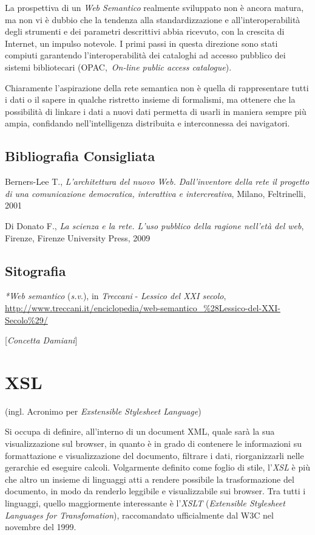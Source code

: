 {La prospettiva di un \emph{Web Semantico} realmente sviluppato non è
ancora matura, ma non vi è dubbio che la tendenza alla standardizzazione
e all'interoperabilità degli strumenti e dei parametri descrittivi abbia
ricevuto, con la crescita di Internet, un impulso notevole. I primi
passi in questa direzione sono stati compiuti garantendo
l'interoperabilità dei cataloghi ad accesso pubblico dei sistemi
bibliotecari (OPAC,~\emph{On-line public access catalogue}).

Chiaramente l'aspirazione della rete semantica non è quella di
rappresentare tutti i dati o il sapere in qualche ristretto insieme di
formalismi, ma ottenere che la possibilità di linkare i dati a nuovi
dati permetta di usarli in maniera sempre più ampia, confidando
nell'intelligenza distribuita e interconnessa dei navigatori.

\section*{Bibliografia Consigliata}
{\parindent0pt 
Berners-Lee T., \emph{L'architettura del nuovo Web. Dall'inventore della
rete il progetto di una comunicazione democratica, interattiva e
intercreativa}, Milano, Feltrinelli, 2001

Di Donato F., \emph{La scienza e la rete. L'uso pubblico della ragione
nell'età del web}, Firenze, Firenze University Press, 2009
}

\section*{Sitografia}
{\parindent0pt 
\emph{*Web semantico} (\emph{s.v}.), in \emph{Treccani} - \emph{Lessico
del XXI secolo},
\url{http://www.treccani.it/enciclopedia/web-semantico_\%28Lessico-del-XXI-Secolo\%29/}

}

\hrulefill 

{[}\emph{Concetta Damiani}{]}




\chapter{XSL}

(ingl. Acronimo per \emph{Exstensible Stylesheet Language})

Si occupa di definire, all'interno di un document XML, quale sarà la sua
visualizzazione sul browser, in quanto è in grado di contenere le
informazioni su formattazione e visualizzazione del documento, filtrare
i dati, riorganizzarli nelle gerarchie ed eseguire calcoli. Volgarmente
definito come foglio di stile, l'\emph{XSL} è più che altro un insieme
di linguaggi atti a rendere possibile la trasformazione del documento,
in modo da renderlo leggibile e visualizzabile sui browser. Tra tutti i
linguaggi, quello maggiormente interessante è l'\emph{XSLT}
(\emph{Extensible Stylesheet Languages for Transfomation}), raccomandato
ufficialmente dal W3C nel novembre del 1999.

}
